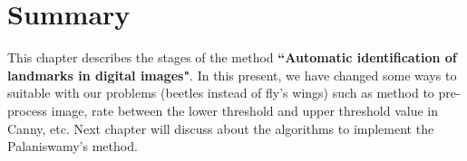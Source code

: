 \section{Summary}
This chapter describes the stages of the method \textbf{``Automatic identification of landmarks in digital images"}. In this present, we have changed some ways to suitable with our problems (beetles instead of fly's wings) such as method to pre-process image, rate between the lower threshold and upper threshold value in Canny, etc. Next chapter will discuss about the algorithms to implement the Palaniswamy's method.